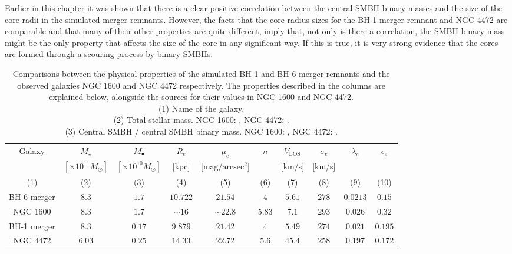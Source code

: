 \documentclass[english, twoside]{HYgradu}
\begin{document}
Earlier in this chapter it was shown that there is a clear positive correlation between the central SMBH binary masses and the size of the core radii in the simulated merger remnants. However, the facts that the core radius sizes for the BH-1 merger remnant and NGC 4472 are comparable and that many of their other properties are quite different, imply that, not only is there a correlation, the SMBH binary mass might be the only property that affects the size of the core in any significant way. If this is true, it is very strong evidence that the cores are formed through a scouring process by binary SMBHs.


\begin{table}
	\begin{center}
		\scriptsize
		\begin{tabular}{c c c c c c c c c c}
		\hline
		\hline
		Galaxy & $M_\star$ & $M_\bullet$ & $R_e$ & $\mu_e$ & $n$ & 
		$V_\mathrm{LOS}$ & $\sigma_e$ & $\lambda_e$ &
		$\epsilon_e$ \\
		& $[\times 10^{11} M_\odot]$ & $[\times 10^{10} M_\odot]$ &
		[kpc] & [$\mathrm{mag/arcsec^2}$] & & [km/s] & [km/s] & & \\
		(1) & (2) & (3) & (4) & (5) & (6) & (7) & (8) & (9) & (10) \\
		\hline
		BH-6 merger & $8.3$ & $1.7$ & $10.722$ & $21.54$ & $4$ & $5.61$ & $278$ & $0.0213$ & $0.15$ \\
		NGC 1600 & $8.3$ & $1.7$ & $\sim 16$ & $\sim 22.8$ & $5.83$ & $7.1$ & $293$ & $0.026$ & $0.32$ \\
		\hdashline
		BH-1 merger & $8.3$ & $0.17$ & $9.879$ & $21.42$ & $4$ & $5.49$ & $274$ & $0.021$ & $0.195$ \\
		NGC 4472 & $6.03$ & $0.25$ & $14.33$ & $22.72$ & $5.6$ & $45.4$ & 
		$258$ & $0.197$ & $0.172$ \\
		\hline
		\end{tabular}
	\end{center}
	\caption{Comparisons between the physical properties of the simulated BH-1 and BH-6 merger remnants and the observed galaxies NGC 1600 and NGC 4472 respectively. The properties described in the columns are explained below, alongside the sources for their values in NGC 1600 and NGC 4472. \\
	(1) Name of the galaxy. \\
	(2) Total stellar mass. NGC 1600: \cite{Thomas2016}, NGC 4472: \cite{Veale2018lambda}. \\
	(3) Central SMBH / central SMBH binary mass. NGC 1600:  \cite{Thomas2016}, NGC 4472: \cite{Rusli2013_BHmass}. \\
}
\end{table}
\end{document}
